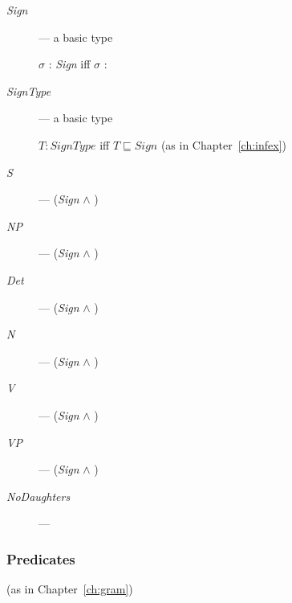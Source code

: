 \begin{description}
  
    \item[\textnormal{\textit{Sign}}] ---  a basic type

      $\sigma$ : \textit{Sign} iff $\sigma$ :

  
\item[\textnormal{\textit{SignType}}] --- a basic type

  $T:\textit{SignType}$ iff $T\sqsubseteq\textit{Sign}$ (as in
  Chapter~\ref{ch:infex})

  
\item[\textnormal{\textit{S}}] --- (\textit{Sign} \d{$\wedge$}
  )
  
\item[\textnormal{\textit{NP}}] --- (\textit{Sign} \d{$\wedge$}
  )

  
\item[\textnormal{\textit{Det}}] --- (\textit{Sign} \d{$\wedge$}
  )
  
\item[\textnormal{\textit{N}}] --- (\textit{Sign} \d{$\wedge$}
  )
  
\item[\textnormal{\textit{V}}] --- (\textit{Sign} \d{$\wedge$}
  )
  
\item[\textnormal{\textit{VP}}] --- (\textit{Sign} \d{$\wedge$}
  )

  
\item[\textnormal{\textit{NoDaughters}}] ---

  


\end{description}

\subsubsection{Predicates} (as in Chapter~\ref{ch:gram})

